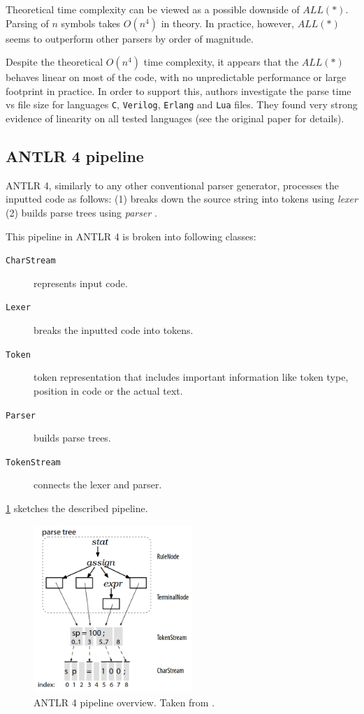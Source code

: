 Theoretical time complexity can be viewed as a possible downside of $ALL(*)$. Parsing of $n$ symbols takes $O(n^4)$ in theory. In practice, however, $ALL(*)$ seems to outperform other parsers by order of magnitude.

Despite the theoretical $O(n^4)$ time complexity, it appears that the $ALL(*)$ behaves linear on most of the code, with no unpredictable performance or large footprint in practice. In order to support this, authors investigate the parse time vs file size for languages \texttt{C}, \texttt{Verilog}, \texttt{Erlang} and \texttt{Lua} files. They found very strong evidence of linearity on all tested languages (see the original paper for details).

\subsection{ANTLR 4 pipeline}

ANTLR 4, similarly to any other conventional parser generator, processes the inputted code as follows: (1) breaks down the source string into tokens using \textit{lexer} (2) builds parse trees using \textit{parser} . 

This pipeline in ANTLR 4 is broken into following classes: 

\begin{description}
	\item[\texttt{CharStream}] represents input code.
	\item[\texttt{Lexer}] breaks the inputted code into tokens.
	\item[\texttt{Token}] token representation that includes important information like token type, position in code or the actual text.
	\item[\texttt{Parser}] builds parse trees.
	\item[\texttt{TokenStream}] connects the lexer and parser.
\end{description}

\cref{antlr_pipeline} sketches the described pipeline.

\begin{figure}[H]
	\centering
	\includegraphics[width=6cm]{img/antlr_pipeline}
	\caption{ANTLR 4 pipeline overview. Taken from \cite{parr2013definitive}.}
	\label{antlr_pipeline}
\end{figure}

